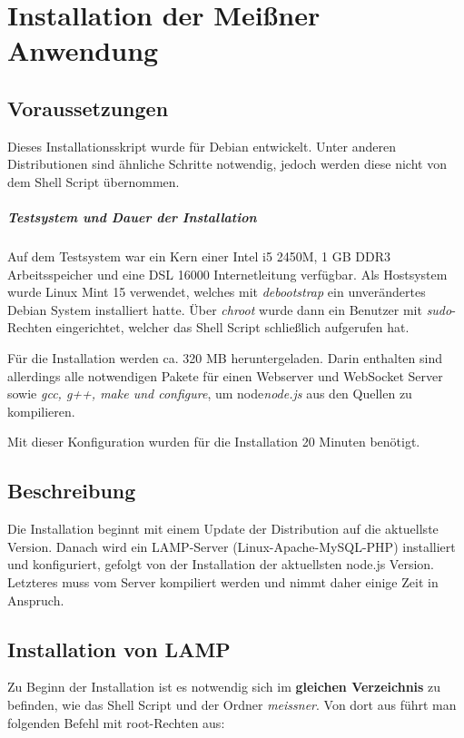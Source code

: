 \chapter{Installation der Meißner Anwendung}
\section{Voraussetzungen}
Dieses Installationsskript wurde für Debian entwickelt. Unter anderen Distributionen sind ähnliche Schritte notwendig, jedoch werden diese nicht von dem Shell Script übernommen.

\paragraph{Testsystem und Dauer der Installation}
Auf dem Testsystem war ein Kern einer Intel i5 2450M, 1 GB DDR3 Arbeitsspeicher und eine DSL 16000 Internetleitung verfügbar. Als Hostsystem wurde Linux Mint 15 verwendet, welches mit \emph{debootstrap} ein unverändertes Debian System installiert hatte. Über \emph{chroot} wurde dann ein Benutzer mit \emph{sudo}-Rechten eingerichtet, welcher das Shell Script schließlich aufgerufen hat.\par 

Für die Installation werden ca. 320 MB heruntergeladen. Darin enthalten sind allerdings alle notwendigen Pakete für einen Webserver und WebSocket Server sowie \emph{gcc, g++, make und configure}, um node\emph{node.js} aus den Quellen zu kompilieren.\par

Mit dieser Konfiguration wurden für die Installation 20 Minuten benötigt.

\section{Beschreibung}
Die Installation beginnt mit einem Update der Distribution auf die aktuellste Version. Danach wird ein LAMP-Server (Linux-Apache-MySQL-PHP) installiert und konfiguriert, gefolgt von der Installation der aktuellsten node.js Version. Letzteres muss vom Server kompiliert werden und nimmt daher einige Zeit in Anspruch.

\section{Installation von LAMP}
Zu Beginn der Installation ist es notwendig sich im \textbf{gleichen Verzeichnis} zu befinden, wie das Shell Script und der Ordner \emph{meissner}. Von dort aus führt man folgenden Befehl mit root-Rechten aus:

